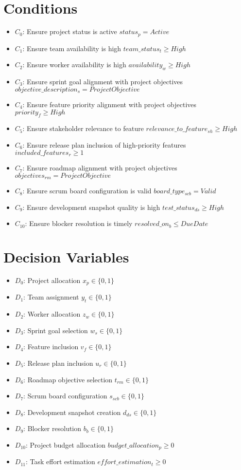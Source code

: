 \documentclass{article}
\begin{document}
\section{Conditions}
\begin{itemize}
    \item $C_0$: Ensure project status is active $status_p = Active$
    \item $C_1$: Ensure team availability is high $team\_status_t \geq High$
    \item $C_2$: Ensure worker availability is high $availability_w \geq High$
    \item $C_3$: Ensure sprint goal alignment with project objectives $objective\_description_s = Project Objective$
    \item $C_4$: Ensure feature priority alignment with project objectives $priority_f \geq High$
    \item $C_5$: Ensure stakeholder relevance to feature $relevance\_to\_feature_{sh} \geq High$
    \item $C_6$: Ensure release plan inclusion of high-priority features $included\_features_r \geq 1$
    \item $C_7$: Ensure roadmap alignment with project objectives $objectives_{rm} = Project Objective$
    \item $C_8$: Ensure scrum board configuration is valid $board\_type_{scb} = Valid$
    \item $C_9$: Ensure development snapshot quality is high $test\_status_{ds} \geq High$
    \item $C_{10}$: Ensure blocker resolution is timely $resolved\_on_b \leq Due Date$
\end{itemize}

\section{Decision Variables}
\begin{itemize}
    \item $D_0$: Project allocation $x_p \in \{0,1\}$
    \item $D_1$: Team assignment $y_t \in \{0,1\}$
    \item $D_2$: Worker allocation $z_w \in \{0,1\}$
    \item $D_3$: Sprint goal selection $w_s \in \{0,1\}$
    \item $D_4$: Feature inclusion $v_f \in \{0,1\}$
    \item $D_5$: Release plan inclusion $u_r \in \{0,1\}$
    \item $D_6$: Roadmap objective selection $t_{rm} \in \{0,1\}$
    \item $D_7$: Scrum board configuration $s_{scb} \in \{0,1\}$
    \item $D_8$: Development snapshot creation $d_{ds} \in \{0,1\}$
    \item $D_9$: Blocker resolution $b_b \in \{0,1\}$
    \item $D_{10}$: Project budget allocation $budget\_allocation_p \geq 0$
    \item $D_{11}$: Task effort estimation $effort\_estimation_t \geq 0$
\end{itemize}
\end{document}

